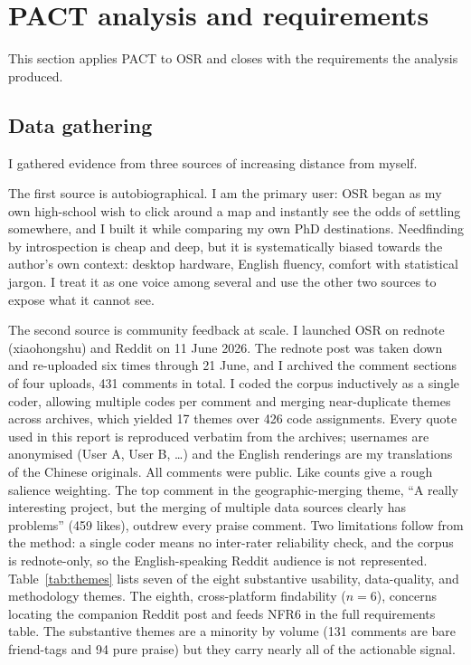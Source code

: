 \section{PACT analysis and requirements}
\label{sec:pact}

This section applies PACT \cite{benyon} to OSR and closes with the requirements the analysis produced.

\subsection{Data gathering}

I gathered evidence from three sources of increasing distance from myself.

The first source is autobiographical. I am the primary user: OSR began as my own high-school wish to click around a map and instantly see the odds of settling somewhere, and I built it while comparing my own PhD destinations. Needfinding by introspection is cheap and deep, but it is systematically biased towards the author's own context: desktop hardware, English fluency, comfort with statistical jargon. I treat it as one voice among several and use the other two sources to expose what it cannot see.

The second source is community feedback at scale. I launched OSR on rednote (xiaohongshu) and Reddit on 11 June 2026. The rednote post was taken down and re-uploaded six times through 21 June, and I archived the comment sections of four uploads, 431 comments in total. I coded the corpus inductively as a single coder, allowing multiple codes per comment and merging near-duplicate themes across archives, which yielded 17 themes over 426 code assignments. Every quote used in this report is reproduced verbatim from the archives; usernames are anonymised (User A, User B, \ldots) and the English renderings are my translations of the Chinese originals. All comments were public. Like counts give a rough salience weighting. The top comment in the geographic-merging theme, ``A really interesting project, but the merging of multiple data sources clearly has problems'' (459 likes), outdrew every praise comment. Two limitations follow from the method: a single coder means no inter-rater reliability check, and the corpus is rednote-only, so the English-speaking Reddit audience is not represented. Table~\ref{tab:themes} lists seven of the eight substantive usability, data-quality, and methodology themes. The eighth, cross-platform findability ($n=6$), concerns locating the companion Reddit post and feeds NFR6 in the full requirements table. The substantive themes are a minority by volume (131 comments are bare friend-tags and 94 pure praise) but they carry nearly all of the actionable signal.

